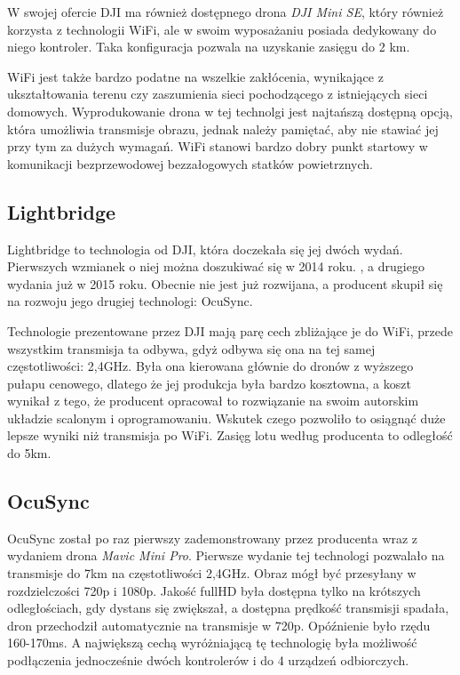 \documentclass[12pt, a4paper, twoside]{report}
\begin{document}
  \hspace{1cm}W swojej ofercie DJI ma również dostępnego drona \emph{DJI Mini SE}, który również korzysta z technologii WiFi, ale w swoim wyposażaniu posiada dedykowany do niego kontroler. Taka konfiguracja pozwala na uzyskanie zasięgu do 2 km. \cite{dji-mavic-mini-se-spec}

\hspace{1cm}WiFi jest także bardzo podatne na wszelkie zakłócenia, wynikające z ukształtowania terenu czy zaszumienia sieci pochodzącego z istniejących sieci domowych. Wyprodukowanie drona w tej technolgi jest najtańszą dostępną opcją, która umożliwia transmisje obrazu, jednak należy pamiętać, aby nie stawiać jej przy tym za dużych wymagań. WiFi stanowi bardzo dobry punkt startowy w komunikacji bezprzewodowej bezzałogowych statków powietrznych.

\subsection{Lightbridge}
\hspace{1cm}Lightbridge to technologia od DJI, która doczekała się jej dwóch wydań. Pierwszych wzmianek o niej można doszukiwać się w 2014 roku. \cite{lightbridge-dji}, a drugiego wydania już w 2015 roku\cite{lightbridge2-dji}. Obecnie nie jest już rozwijana, a producent skupił się na rozwoju jego drugiej technologi: OcuSync.

\hspace{1cm}Technologie prezentowane przez DJI mają parę cech zbliżające je do WiFi, przede wszystkim transmisja ta odbywa, gdyż odbywa się ona na tej samej częstotliwości: 2,4GHz. Była ona kierowana głównie do dronów z wyższego pułapu cenowego, dlatego że jej produkcja była bardzo kosztowna, a koszt wynikał z tego, że producent opracował to rozwiązanie na swoim autorskim układzie scalonym i oprogramowaniu. Wskutek czego pozwoliło to osiągnąć duże lepsze wyniki niż transmisja po WiFi. Zasięg lotu według producenta to odległość do 5km.

\subsection{OcuSync} 
\hspace{1cm}OcuSync został po raz pierwszy zademonstrowany przez producenta wraz z wydaniem drona \emph{Mavic Mini Pro}. Pierwsze wydanie tej technologi pozwalało na transmisje do 7km na częstotliwości 2,4GHz. Obraz mógł być przesyłany w rozdzielczości 720p i 1080p. Jakość fullHD była dostępna tylko na krótszych odległościach, gdy dystans się zwiększał, a dostępna prędkość transmisji spadała, dron przechodził automatycznie na transmisje w 720p. Opóźnienie było rzędu 160-170ms. A największą cechą wyróżniającą tę technologię była możliwość podłączenia jednocześnie dwóch kontrolerów i do 4 urządzeń odbiorczych.
\end{document}
